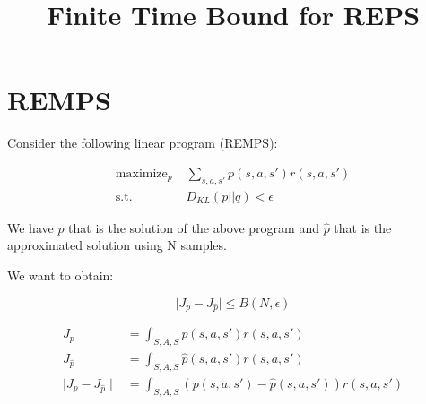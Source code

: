 \documentclass[11pt]{article}
\begin{document}
\title{Finite Time Bound for REPS}
\maketitle

\section{REMPS}

Consider the following linear program (REMPS):

\begin{align*}
\text{maximize}_{p} \; & \sum_{s,a,s'} p(s,a,s') r(s,a,s') \\
\text{s.t.} \; & D_{KL}(p || q) < \epsilon
\end{align*}

We have $p$ that is the solution of the above program and $\hat{p}$ that is the approximated solution using N samples.

We want to obtain:

\begin{equation}
	\mid J_p - J_{\hat{p}} \mid \leq B(N,\epsilon)
\end{equation}

\begin{align*}
J_p &= \int_{S,A,S} p(s,a,s') r(s,a,s') \\
J_{\hat{p}} &= \int_{S,A,S} \hat{p}(s,a,s') r(s,a,s') \\
\mid J_p - J_{\hat{p}} \mid &= \int_{S,A,S} (p(s,a,s') - \hat{p}(s,a,s'))r(s,a,s')
\end{align*}
\end{document}
